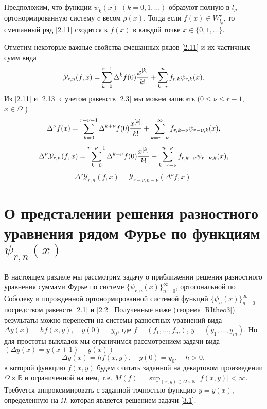 \begin{theorem}\label{RItheo2}
Предположим, что    функции $\psi_k(x)$ $(k=0,1,\ldots)$ образуют полную в $l_\rho$ ортонормированную систему  c весом   $\rho(x)$. Тогда если $f(x)\in W^r_{l_\rho}$, то смешанный ряд \eqref{2.11} сходится к $f(x)$ в каждой точке $x\in \{0,1,\ldots\}$.
\end{theorem}
Отметим некоторые важные свойства смешанных рядов  \eqref{2.11} и их частичных сумм вида
\begin{equation}\label{2.13}
 \mathcal{ Y}_{r,n}(f,x)= \sum_{k=0}^{r-1}\Delta^kf(0){x^{[k]}\over k!} +\sum_{k=r}^{n}f_{r,k} \psi_{r,k}(x).
  \end{equation}
Из \eqref{2.11} и \eqref{2.13} с учетом равенств \eqref{2.3} мы можем записать ($0\le\nu\le r-1$, $x\in \Omega$ )
 \begin{equation}\label{2.130}
 \Delta^\nu f(x)= \sum_{k=0}^{r-\nu-1}\Delta^{k+\nu}f(0){x^{[k]}\over k!} +\sum_{k=r-\nu}^\infty f_{r,k+\nu} \psi_{r-\nu,k}(x),
  \end{equation}
  \begin{equation}\label{2.14}
 \Delta^\nu\mathcal{ Y}_{r,n}(f,x)= \sum_{k=0}^{r-\nu-1}\Delta^{k+\nu}f(0){x^{[k]}\over k!} +\sum_{k=r-\nu}^{n-\nu} f_{r,k+\nu} \psi_{r-\nu,k}(x),
  \end{equation}
 \begin{equation}\label{2.15}
 \Delta^\nu\mathcal{ Y}_{r,n}(f,x) = \mathcal{ Y}_{r-\nu,n-\nu}(\Delta^\nu f,x).
  \end{equation}

  \section{О предсталении решения разностного уравнения рядом Фурье по функциям $\psi_{r,n}(x)$}

  В настоящем разделе мы рассмотрим задачу о приближении решения разностного уравнения  суммами  Фурье по системе $\{\psi_{r,n}(x)\}_{n=0}^\infty$, ортогональной по Соболеву и порожденной ортонормированной системой функций $\{\psi_{n}(x)\}_{n=0}^\infty$ посредством равенств \eqref{2.1} и \eqref{2.2}.
 Полученные ниже (теорема \ref{RItheo3}) результаты можно перенести на системы разностных  уравнений вида
$\Delta y(x)=hf(x,y), \quad y(0)=y_0$, где $f=(f_1, \ldots, f_m)$, $y=(y_1, \ldots, y_m)$. Но для простоты выкладок мы ограничимся рассмотрением задачи  вида $(\Delta y(x)=y(x+1)-y(x))$
\begin{equation}\label{3.1}
\Delta y(x)=h f(x,y), \quad y(0)=y_0, \quad h>0,
\end{equation}
 в которой функцию   $f(x,y)$  будем считать заданной   на   декартовом произведении $\Omega\times\mathbb{R}$ и ограниченной на нем, т.е. $M(f)=\sup_{(x,y)\in \Omega\times\mathbb{R}}|f(x,y)|<\infty$.   Требуется аппроксимировать с заданной точностью  функцию $y=y(x)$, определенную на $\Omega$, которая является решением задачи \eqref{3.1}.

